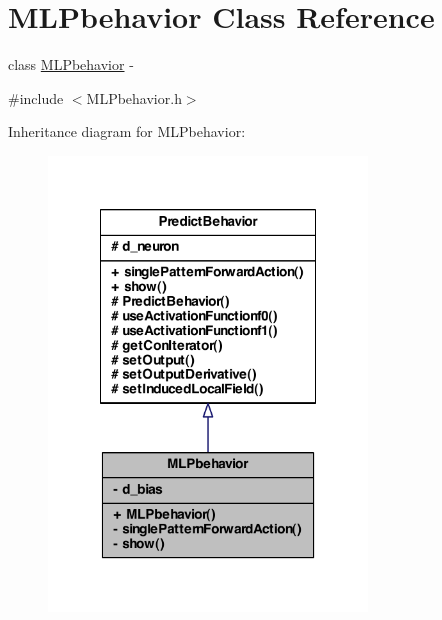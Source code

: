 \hypertarget{class_m_l_pbehavior}{
\section{MLPbehavior Class Reference}
\label{class_m_l_pbehavior}
}


class \hyperlink{class_m_l_pbehavior}{MLPbehavior} -\/  




{\ttfamily \#include $<$MLPbehavior.h$>$}



Inheritance diagram for MLPbehavior:
\nopagebreak
\begin{figure}[H]
\begin{center}
\leavevmode
\includegraphics[width=240pt]{class_m_l_pbehavior__inherit__graph}
\end{center}
\end{figure}


